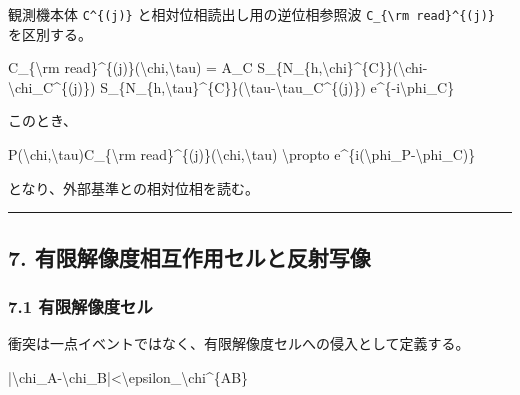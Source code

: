 \documentclass[
  a4paper,
]{article}
\newenvironment{Shaded}{}{}
\newcommand{\NormalTok}[1]{#1}
\begin{document}
観測機本体 \texttt{C\^{}\{(j)\}} と相対位相読出し用の逆位相参照波
\texttt{C\_\{\textbackslash{}rm\ read\}\^{}\{(j)\}} を区別する。

\begin{Shaded}
\begin{Highlighting}[]
\NormalTok{C\_\{\textbackslash{}rm read\}\^{}\{(j)\}(\textbackslash{}chi,\textbackslash{}tau)}
\NormalTok{=}
\NormalTok{A\_C}
\NormalTok{S\_\{N\_\{h,\textbackslash{}chi\}\^{}\{C\}\}(\textbackslash{}chi{-}\textbackslash{}chi\_C\^{}\{(j)\})}
\NormalTok{S\_\{N\_\{h,\textbackslash{}tau\}\^{}\{C\}\}(\textbackslash{}tau{-}\textbackslash{}tau\_C\^{}\{(j)\})}
\NormalTok{e\^{}\{{-}i\textbackslash{}phi\_C\}}
\end{Highlighting}
\end{Shaded}

このとき、

\begin{Shaded}
\begin{Highlighting}[]
\NormalTok{P(\textbackslash{}chi,\textbackslash{}tau)C\_\{\textbackslash{}rm read\}\^{}\{(j)\}(\textbackslash{}chi,\textbackslash{}tau)}
\NormalTok{\textbackslash{}propto e\^{}\{i(\textbackslash{}phi\_P{-}\textbackslash{}phi\_C)\}}
\end{Highlighting}
\end{Shaded}

となり、外部基準との相対位相を読む。

\begin{center}\rule{0.5\linewidth}{0.5pt}\end{center}

\subsection{7.
有限解像度相互作用セルと反射写像}\label{ux6709ux9650ux89e3ux50cfux5ea6ux76f8ux4e92ux4f5cux7528ux30bbux30ebux3068ux53cdux5c04ux5199ux50cf}

\subsubsection{7.1
有限解像度セル}\label{ux6709ux9650ux89e3ux50cfux5ea6ux30bbux30eb}

衝突は一点イベントではなく、有限解像度セルへの侵入として定義する。

\begin{Shaded}
\begin{Highlighting}[]
\NormalTok{|\textbackslash{}chi\_A{-}\textbackslash{}chi\_B|\textless{}\textbackslash{}epsilon\_\textbackslash{}chi\^{}\{AB\}}
\end{Highlighting}
\end{Shaded}
\end{document}
